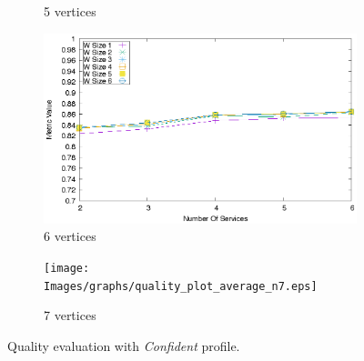 \begin{figure}[ht]
\begin{subfigure}{0.33\textwidth}
    \caption{5 vertices}
    \label{fig:third}
  \end{subfigure}
  \hfill
  \begin{subfigure}{0.33\textwidth}
    \includegraphics[width=\textwidth]{Images/graphs/quality_plot_average_n6.eps}
    \caption{6 vertices}
    \label{fig:third}
  \end{subfigure}
  \hfill
  \begin{subfigure}{0.33\textwidth}
    \texttt{[image: Images/graphs/quality\_plot\_average\_n7.eps]}
    \caption{7 vertices}
    \label{fig:third}
  \end{subfigure}
  \caption{ Quality evaluation with \textit{Confident} profile.}
  \label{fig:quality_window_good}
\end{figure}

